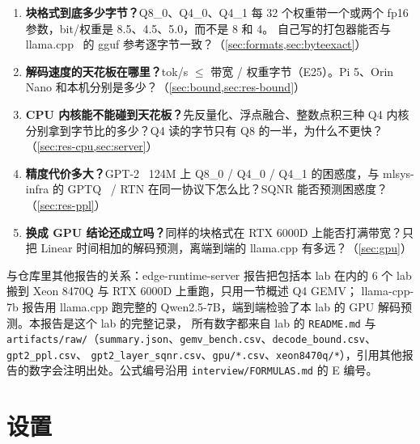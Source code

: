 \documentclass[11pt,a4paper]{ctexart}
\begin{document}
\begin{enumerate}[label=Q\arabic*.]
  \item \textbf{块格式到底多少字节？}Q8\_0、Q4\_0、Q4\_1 每 32 个权重带一个或两个 fp16 参数，bit/权重是 8.5、4.5、5.0，而不是 8 和 4。
        自己写的打包器能否与 llama.cpp~\cite{llamacpp} 的 gguf 参考逐字节一致？（\cref{sec:formats,sec:byteexact}）
  \item \textbf{解码速度的天花板在哪里？}tok/s $\le$ 带宽 / 权重字节（E25）。Pi 5、Orin Nano 和本机分别是多少？（\cref{sec:bound,sec:res-bound}）
  \item \textbf{CPU 内核能不能碰到天花板？}先反量化、浮点融合、整数点积三种 Q4 内核分别拿到字节比的多少？Q4 读的字节只有 Q8 的一半，为什么不更快？（\cref{sec:res-cpu,sec:server}）
  \item \textbf{精度代价多大？}GPT-2~\cite{gpt2} 124M 上 Q8\_0 / Q4\_0 / Q4\_1 的困惑度，与 mlsys-infra 的 GPTQ~\cite{gptq} / RTN 在同一协议下怎么比？SQNR 能否预测困惑度？（\cref{sec:res-ppl}）
  \item \textbf{换成 GPU 结论还成立吗？}同样的块格式在 RTX 6000D 上能否打满带宽？只把 Linear 时间相加的解码预测，离端到端的 llama.cpp 有多远？（\cref{sec:gpu}）
\end{enumerate}

与仓库里其他报告的关系：edge-runtime-server 报告把包括本 lab 在内的 6 个 lab 搬到 Xeon 8470Q 与 RTX 6000D 上重跑，只用一节概述 Q4 GEMV；
llama-cpp-7b 报告用 llama.cpp 跑完整的 Qwen2.5-7B，端到端检验了本 lab 的 GPU 解码预测。本报告是这个 lab 的完整记录，
所有数字都来自 lab 的 \texttt{README.md} 与 \nolinkurl{artifacts/raw/}（\texttt{summary.json}、\texttt{gemv\_bench.csv}、\texttt{decode\_bound.csv}、\texttt{gpt2\_ppl.csv}、
\texttt{gpt2\_layer\_sqnr.csv}、\nolinkurl{gpu/*.csv}、\nolinkurl{xeon8470q/*}），引用其他报告的数字会注明出处。公式编号沿用 \nolinkurl{interview/FORMULAS.md} 的 E 编号。

\section{设置}\label{sec:setup}
\end{document}
